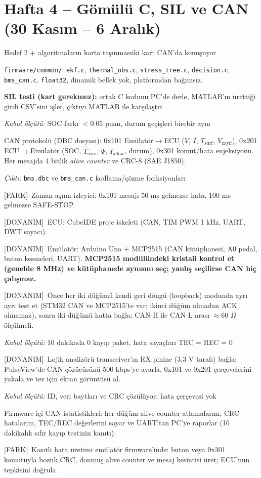 \documentclass[11pt,a4paper]{article}
\newcommand{\cikti}[1]{\par{\small\textit{Çıktı:} #1}}
\newcommand{\kabul}[1]{\par{\small\textit{Kabul ölçütü:} #1}}
\newcommand{\donanim}{\textcolor{uyari}{\small[DONANIM]}\ }
\newcommand{\artı}{\textcolor{ana}{\small[FARK]}\ }
\begin{document}
\section{Hafta 4 -- Gömülü C, SIL ve CAN (30 Kasım -- 6 Aralık)}
\begin{faz}{Hedef 2 + algoritmaların karta taşınması}{iki kart CAN'da konuşuyor}
\end{faz}
\begin{gorev}
  \item \texttt{firmware/common/}: \texttt{ekf.c}, \texttt{thermal\_obs.c}, \texttt{stress\_tree.c}, \texttt{decision.c}, \texttt{bms\_can.c}. \texttt{float32}, dinamik bellek yok, platformdan bağımsız.
  \item \textbf{SIL testi (kart gerekmez):} ortak C kodunu PC'de derle, MATLAB'ın ürettiği girdi CSV'sini işlet, çıktıyı MATLAB ile karşılaştır.
  \kabul{SOC farkı $<0.05$ puan, durum geçişleri birebir aynı}
  \item CAN protokolü (DBC dosyası):
  0x101 Emülatör$\rightarrow$ECU ($V$, $I$, $T_\text{surf}$, $V_\text{zayıf}$),
  0x201 ECU$\rightarrow$Emülatör (SOC, $\hat T_\text{core}$, $\Psi$, $I_\text{allow}$, durum),
  0x301 komut/hata enjeksiyonu. Her mesajda 4 bitlik \emph{alive counter} ve CRC-8 (SAE J1850).
  \cikti{\texttt{bms.dbc} ve \texttt{bms\_can.c} kodlama/çözme fonksiyonları}
  \item \artı Zaman aşımı izleyici: 0x101 mesajı 50 ms gelmezse hata, 100 ms gelmezse SAFE-STOP.
  \item \donanim ECU: CubeIDE proje iskeleti (CAN, TIM PWM 1 kHz, UART, DWT sayacı).
  \item \donanim Emülatör: Arduino Uno + MCP2515 (CAN kütüphanesi, A0 pedal, buton kesmeleri, UART). \textbf{MCP2515 modülündeki kristali kontrol et (genelde 8 MHz) ve kütüphanede aynısını seç; yanlış seçilirse CAN hiç çalışmaz.}
  \item \donanim Önce her iki düğümü kendi geri döngü (loopback) modunda ayrı ayrı test et (STM32 CAN ve MCP2515'te var; ikinci düğüm olmadan ACK alınamaz), sonra iki düğümü hatta bağla; CAN-H ile CAN-L arası $\approx60$ $\Omega$ ölçülmeli.
  \kabul{10 dakikada 0 kayıp paket, hata sayaçları TEC = REC = 0}
  \item \donanim Lojik analizörü transceiver'ın RX pinine (3,3 V tarafı) bağla; PulseView'de CAN çözücüsünü 500 kbps'ye ayarla, 0x101 ve 0x201 çerçevelerini yakala ve tez için ekran görüntüsü al.
  \kabul{ID, veri baytları ve CRC çözülüyor; hata çerçevesi yok}
  \item Firmware içi CAN istatistikleri: her düğüm alive counter atlamalarını, CRC hatalarını, TEC/REC değerlerini sayar ve UART'tan PC'ye raporlar (10 dakikalık sıfır kayıp testinin kanıtı).
  \item \artı Kasıtlı hata üretimi emülatör firmware'inde: buton veya 0x301 komutuyla bozuk CRC, donmuş alive counter ve mesaj kesintisi üret; ECU'nun tepkisini doğrula.
\end{gorev}
\end{document}
